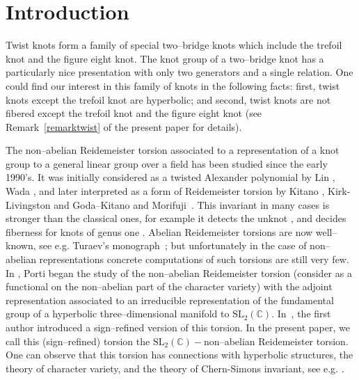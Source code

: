 \documentclass[a4paper]{amsart}
\theoremstyle{plain}
\theoremstyle{definition}
\theoremstyle{remark}
\newcommand{\C}{{\mathbb C}}
\newcommand{\SL}{{\mathrm{SL}_2(\C)}}
\begin{document}
\section{Introduction}
    Twist knots form a family of special two--bridge knots which include the trefoil knot and the figure eight knot. The knot group of a two--bridge knot has a particularly nice presentation  with only two generators and a single relation. One could find our interest in this family of knots in the following facts: first, twist knots except the trefoil knot are hyperbolic; and second, twist knots are not fibered except the trefoil knot and the figure eight knot (see Remark~\ref{remarktwist} of the present paper for details).

The non--abelian Reidemeister torsion associated to a representation of a knot group to a general linear group over a field has been studied since the early 1990's. {It was} initially considered as a twisted Alexander polynomial by Lin  \cite{Lin01},  Wada \cite{Wada94}, and later interpreted as a form of Reidemeister torsion by Kitano \cite{Kitano}, Kirk-Livingston \cite{KL} and Goda--Kitano and Morifuji~\cite{GKM}. This invariant in many cases is stronger than the classical ones,  for example  it detects the unknot \cite{SW06}, and decides fiberness for knots of genus one  \cite{FV07}. Abelian Reidemeister torsions are now well--known, see e.g. Turaev's monograph~\cite{Turaev:2002}; but unfortunately in the case of non--abelian representations concrete computations of such torsions are still very few. 
In \cite{Porti:1997}, Porti began the study of the non--abelian Reidemeister torsion (consider as a functional on the non--abelian part of the character variety) with the adjoint representation associated to an irreducible representation of the fundamental group of a hyperbolic three--dimensional manifold to $\SL$. In~\cite{JDFourier}, the first author introduced a sign--refined version of this torsion. 
In the present paper, we call this (sign--refined) torsion  the $\SL-$non--abelian Reidemeister torsion. One can observe that this torsion has connections with hyperbolic structures, the theory of character variety, and the theory of Chern-Simons invariant, see e.g. \cite{DK05}. 
\end{document}
